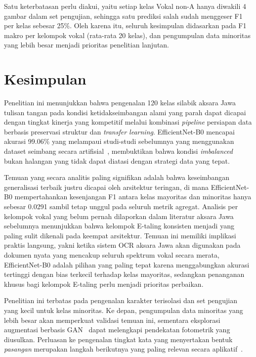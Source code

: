 \documentclass[conference]{IEEEtran}
\begin{document}
Satu keterbatasan perlu diakui, yaitu setiap kelas Vokal non-A hanya
diwakili 4 gambar dalam set pengujian, sehingga satu prediksi
salah sudah menggeser F1 per kelas sebesar 25\%.
Oleh karena itu, seluruh kesimpulan didasarkan pada F1 makro per
kelompok vokal (rata-rata 20 kelas), dan pengumpulan data
minoritas yang lebih besar menjadi prioritas penelitian lanjutan.

\section{Kesimpulan}
\label{sec:conclusion}

Penelitian ini menunjukkan bahwa pengenalan 120 kelas silabik
aksara Jawa tulisan tangan pada kondisi ketidakseimbangan alami
yang parah dapat dicapai dengan tingkat kinerja yang kompetitif
melalui kombinasi \textit{pipeline} persiapan data berbasis
preservasi struktur dan \textit{transfer learning}.
EfficientNet-B0 mencapai akurasi 99.06\% yang melampaui
studi-studi sebelumnya yang menggunakan dataset seimbang
secara artifisial~\cite{susantoIJECE2023}, membuktikan bahwa
kondisi \textit{imbalanced} bukan halangan yang tidak dapat diatasi
dengan strategi data yang tepat.

Temuan yang secara analitis paling signifikan adalah bahwa
keseimbangan generalisasi terbaik justru dicapai oleh arsitektur
teringan, di mana EfficientNet-B0 mempertahankan kesenjangan F1
antara kelas mayoritas dan minoritas hanya sebesar 0.0291 sambil
tetap unggul pada seluruh metrik agregat.
Analisis per kelompok vokal yang belum pernah dilaporkan dalam
literatur aksara Jawa sebelumnya menunjukkan bahwa kelompok
E-taling konsisten menjadi yang paling sulit dikenali pada keempat
arsitektur.
Temuan ini memiliki implikasi praktis langsung, yakni ketika sistem
OCR aksara Jawa akan digunakan pada dokumen nyata yang mencakup
seluruh spektrum vokal secara merata, EfficientNet-B0 adalah pilihan
yang paling tepat karena menggabungkan akurasi tertinggi dengan bias
terkecil terhadap kelas mayoritas, sedangkan penanganan khusus bagi
kelompok E-taling perlu menjadi prioritas perbaikan.

Penelitian ini terbatas pada pengenalan karakter terisolasi dan
set pengujian yang kecil untuk kelas minoritas.
Ke depan, pengumpulan data minoritas yang lebih besar akan
memperkuat validasi temuan ini, sementara eksplorasi augmentasi
berbasis GAN~\cite{faizin2025} dapat melengkapi pendekatan
fotometrik yang diusulkan.
Perluasan ke pengenalan tingkat kata yang menyertakan bentuk
\textit{pasangan} merupakan langkah berikutnya yang paling
relevan secara aplikatif~\cite{wicaksono2024}.
\end{document}
